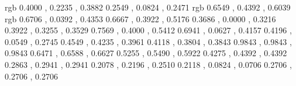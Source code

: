 \definecolor{ebizome}	{rgb}	{	0.4000	,	0.2235	,	0.3882	}
\definecolor{hujisusutake}{rgb}	{	0.2549	,	0.0824	,	0.2471	}
\definecolor{usuebi}	{rgb}	{	0.6549	,	0.4392	,	0.6039	}
\definecolor{botan}	{rgb}	{	0.6706	,	0.0392	,	0.4353	}
\definecolor{umemurasaki}{rgb}	{	0.6667	,	0.3922	,	0.5176	}
\definecolor{nisemurasaki}{rgb}	{	0.3686	,	0.0000	,	0.3216	}
\definecolor{murasakitobi}{rgb}	{	0.3922	,	0.3255	,	0.3529	}
\definecolor{ususuo}{rgb}	{	0.7569	,	0.4000	,	0.5412	}
\definecolor{suo}{rgb}	        {	0.6941	,	0.0627	,	0.4157	}
\definecolor{kuwanomi}{rgb}	{	0.4196	,	0.0549	,	0.2745	}
\definecolor{nibi}{rgb}	        {	0.4549	,	0.4235	,	0.3961	}
\definecolor{benikeshi}{rgb}	{	0.4118	,	0.3804	,	0.3843	}
\definecolor{shironeri}{rgb}	{	0.9843	,	0.9843	,	0.9843	}
\definecolor{shironezumi}{rgb}	{	0.6471	,	0.6588	,	0.6627	}
\definecolor{ginnezumi}{rgb}	{	0.5255	,	0.5490	,	0.5922	}
\definecolor{sunezumi}{rgb}	{	0.4275	,	0.4392	,	0.4392	}
\definecolor{dobunezumi}{rgb}	{	0.2863	,	0.2941	,	0.2941	}
\definecolor{aisumicha}{rgb}	{	0.2078	,	0.2196	,	0.2510	}
\definecolor{binrojizome}{rgb}	{	0.2118	,	0.0824	,	0.0706	}
\definecolor{sumizome}{rgb}	{	0.2706	,	0.2706	,	0.2706	}
